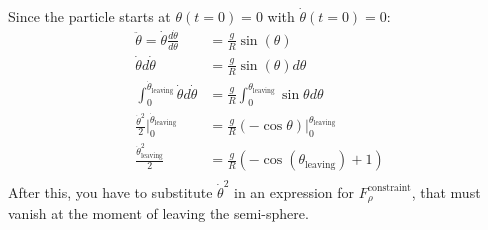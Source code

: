 \documentclass[11pt, a4paper, twoside]{article}
\begin{document}
\begin{enumerate}
	Since the particle starts at $\theta(t=0) = 0$ with $\dot{\theta}(t=0) = 0$:
	$$
	\begin{aligned}
		\ddot{\theta} = \dot{\theta} \frac{d \dot{\theta}}{d \theta}
		&= \frac{g}{R} \sin(\theta)\\
		\dot{\theta} d \dot{\theta}
		&= \frac{g}{R} \sin(\theta) d \theta \\
		\int_0^{\dot{\theta}_\mathrm{leaving}} \dot{\theta} d \dot{\theta}
		&= \frac{g}{R} \int_0^{\theta_\mathrm{leaving}} \sin{\theta} d \theta\\
		\frac{\dot{\theta}^2}{2} \bigg|_0^{\dot{\theta}_\mathrm{leaving}}
		&= \frac{g}{R} (-\cos{\theta}) \bigg|_0^{\theta_\mathrm{leaving}}\\
		\frac{\dot{\theta}_\mathrm{leaving}^2}{2}
		&= \frac{g}{R} (-\cos(\theta_\mathrm{leaving}) + 1)\\
	\end{aligned}
	$$
	After this, you have to substitute $\dot{\theta}^2$ in an expression for $F^\mathrm{constraint}_{\rho}$, that must vanish at the moment of leaving the semi-sphere.


\end{enumerate}
\end{document}
